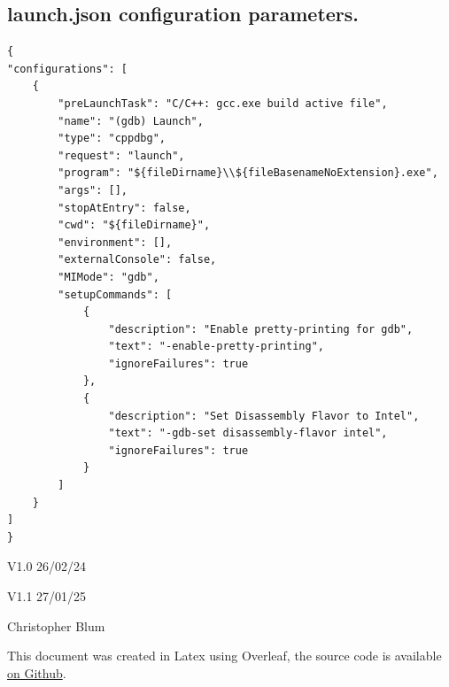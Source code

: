 \documentclass{article}
\begin{document}
\subsection{launch.json configuration parameters.}
\begin{verbatim}
{
"configurations": [
    {   
        "preLaunchTask": "C/C++: gcc.exe build active file",
        "name": "(gdb) Launch",
        "type": "cppdbg",
        "request": "launch",
        "program": "${fileDirname}\\${fileBasenameNoExtension}.exe",
        "args": [],
        "stopAtEntry": false,
        "cwd": "${fileDirname}",
        "environment": [],
        "externalConsole": false,
        "MIMode": "gdb",
        "setupCommands": [
            {
                "description": "Enable pretty-printing for gdb",
                "text": "-enable-pretty-printing",
                "ignoreFailures": true
            },
            {
                "description": "Set Disassembly Flavor to Intel",
                "text": "-gdb-set disassembly-flavor intel",
                "ignoreFailures": true
            }
        ]
    }
]
}
\end{verbatim}

\par
V1.0 26/02/24\par
V1.1 27/01/25\par
Christopher Blum\par
This document was created in Latex using Overleaf, the source code is available \href{https://github.com/PrimaryComet/CSA-VSCode-Setup-Guide}{on Github}.
\end{document}
